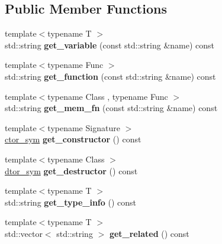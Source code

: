 \subsection*{Public Member Functions}
\begin{DoxyCompactItemize}
\item 
{\footnotesize template$<$typename T $>$ }\\std\+::string {\bfseries get\+\_\+variable} (const std\+::string \&name) const \hypertarget{a00214_af2ce8bb42b3faced27dc0a04e1b69b75}{}\label{a00214_af2ce8bb42b3faced27dc0a04e1b69b75}

\item 
{\footnotesize template$<$typename Func $>$ }\\std\+::string {\bfseries get\+\_\+function} (const std\+::string \&name) const \hypertarget{a00214_ae1b55c8f8413e1e04add9204b9ea5720}{}\label{a00214_ae1b55c8f8413e1e04add9204b9ea5720}

\item 
{\footnotesize template$<$typename Class , typename Func $>$ }\\std\+::string {\bfseries get\+\_\+mem\+\_\+fn} (const std\+::string \&name) const \hypertarget{a00214_a413658267ea0a6b6b814a757bf739679}{}\label{a00214_a413658267ea0a6b6b814a757bf739679}

\item 
{\footnotesize template$<$typename Signature $>$ }\\\hyperlink{a00070}{ctor\+\_\+sym} {\bfseries get\+\_\+constructor} () const \hypertarget{a00214_ae3d2155c3551738b1a9f96fbec1056c6}{}\label{a00214_ae3d2155c3551738b1a9f96fbec1056c6}

\item 
{\footnotesize template$<$typename Class $>$ }\\\hyperlink{a00079}{dtor\+\_\+sym} {\bfseries get\+\_\+destructor} () const \hypertarget{a00214_a89f5339024ff1d41f4d5a56bb91965e1}{}\label{a00214_a89f5339024ff1d41f4d5a56bb91965e1}

\item 
{\footnotesize template$<$typename T $>$ }\\std\+::string {\bfseries get\+\_\+type\+\_\+info} () const \hypertarget{a00214_a9bfca75f8e76adb7bea56f62bbc7942c}{}\label{a00214_a9bfca75f8e76adb7bea56f62bbc7942c}

\item 
{\footnotesize template$<$typename T $>$ }\\std\+::vector$<$ std\+::string $>$ {\bfseries get\+\_\+related} () const \hypertarget{a00214_abdb8cd66ce22dc9f7dfdef17d9279766}{}\label{a00214_abdb8cd66ce22dc9f7dfdef17d9279766}


\end{DoxyCompactItemize}
